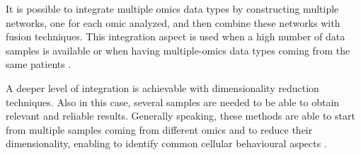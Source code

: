 It is possible to integrate multiple omics data types by constructing multiple networks, one for each omic analyzed, and then combine these networks with fusion techniques.
This integration aspect is used when a high number of data samples is available or when having multiple-omics data types coming from the same patients \cite{Wang2014}.

A deeper level of integration is achievable with dimensionality reduction techniques. 
Also in this case, several samples are needed to be able to obtain relevant and reliable results.
Generally speaking, these methods are able to start from multiple samples coming from different omics and to reduce their dimensionality, enabling to identify common cellular behavioural aspects \cite{Rohart2017, Argelaguet2018}.



